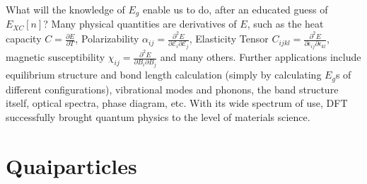 \documentclass{article}
\begin{document}
What will the knowledge of $E_g$ enable us to do, after an educated guess of $E_{XC}[n]$? Many physical quantities are derivatives of $E$, such as the heat capacity $C=\frac{\partial E}{\partial T}$, Polarizability $\alpha_{ij}=\frac{\partial^2 E}{\partial\mathcal{E}_i\partial\mathcal{E}_j}$, Elasticity Tensor $C_{ijkl}=\frac{\partial^2 E}{\partial\epsilon_{ij}\partial\epsilon_{kl}}$, magnetic susceptibility $\chi_{ij}=\frac{\partial^2 E}{\partial B_i \partial B_j}$ and many others. Further applications include equilibrium structure and bond length calculation (simply by calculating $E_g$s of different configurations), vibrational modes and phonons, the band structure itself, optical spectra, phase diagram, etc. With its wide spectrum of use, DFT successfully brought quantum physics to the level of materials science.

\section*{Quaiparticles}
\end{document}

